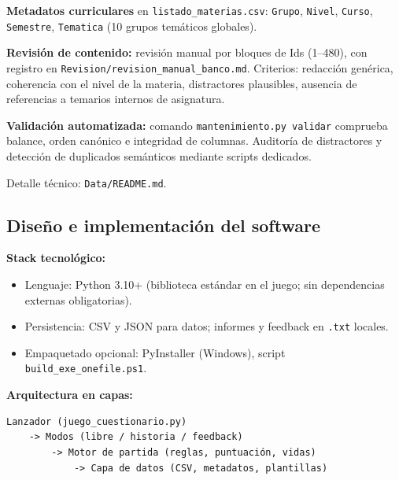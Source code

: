 \documentclass[11pt,a4paper]{article}
\newcommand{\bloquetfg}[1]{\par\smallskip\noindent #1\par}
\begin{document}
\bloquetfg{\textbf{Metadatos curriculares} en \texttt{listado\_materias.csv}: \texttt{Grupo}, \texttt{Nivel}, \texttt{Curso}, \texttt{Semestre}, \texttt{Tematica} (10 grupos temáticos globales).}

\bloquetfg{\textbf{Revisión de contenido:} revisión manual por bloques de Ids (1--480), con registro en \texttt{Revision/revision\_manual\_banco.md}. Criterios: redacción genérica, coherencia con el nivel de la materia, distractores plausibles, ausencia de referencias a temarios internos de asignatura.}

\bloquetfg{\textbf{Validación automatizada:} comando \texttt{mantenimiento.py validar} comprueba balance, orden canónico e integridad de columnas. Auditoría de distractores y detección de duplicados semánticos mediante scripts dedicados.}

\bloquetfg{Detalle técnico: \texttt{Data/README.md}.}

\subsection{Diseño e implementación del software}

\textbf{Stack tecnológico:}
\begin{itemize}
  \item Lenguaje: Python 3.10+ (biblioteca estándar en el juego; sin dependencias externas obligatorias).
  \item Persistencia: CSV y JSON para datos; informes y feedback en \texttt{.txt} locales.
  \item Empaquetado opcional: PyInstaller (Windows), script \texttt{build\_exe\_onefile.ps1}.
\end{itemize}

\textbf{Arquitectura en capas:}
\begin{verbatim}
Lanzador (juego_cuestionario.py)
    -> Modos (libre / historia / feedback)
        -> Motor de partida (reglas, puntuación, vidas)
            -> Capa de datos (CSV, metadatos, plantillas)
\end{verbatim}
\end{document}
